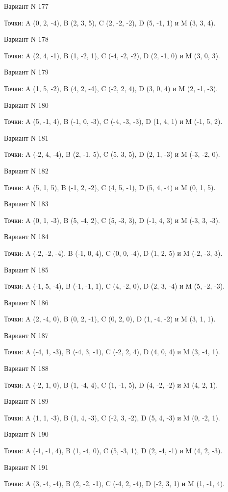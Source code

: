 \documentclass[11pt]{report}
\begin{document}
Вариант N 177

Точки: A (0, 2, -4), B (2, 3, 5), C (2, -2, -2), D (5, -1, 1) и M (3, 3, 4).

Вариант N 178

Точки: A (2, 4, -1), B (1, -2, 1), C (-4, -2, -2), D (2, -1, 0) и M (3, 0, 3).

Вариант N 179

Точки: A (1, 5, -2), B (4, 2, -4), C (-2, 2, 4), D (3, 0, 4) и M (2, -1, -3).

Вариант N 180

Точки: A (5, -1, 4), B (-1, 0, -3), C (-4, -3, -3), D (1, 4, 1) и M (-1, 5, 2).

Вариант N 181

Точки: A (-2, 4, -4), B (2, -1, 5), C (5, 3, 5), D (2, 1, -3) и M (-3, -2, 0).

Вариант N 182

Точки: A (5, 1, 5), B (-1, 2, -2), C (4, 5, -1), D (5, 4, -4) и M (0, 1, 5).

Вариант N 183

Точки: A (0, 1, -3), B (5, -4, 2), C (5, -3, 3), D (-1, 4, 3) и M (-3, 3, -3).

Вариант N 184

Точки: A (-2, -2, -4), B (-1, 0, 4), C (0, 0, -4), D (1, 2, 5) и M (-2, -3, 3).

Вариант N 185

Точки: A (-1, 5, -4), B (-1, -1, 1), C (4, -2, 0), D (2, 3, -4) и M (5, -2, -3).

Вариант N 186

Точки: A (2, -4, 0), B (0, 2, -1), C (0, 2, 0), D (1, -4, -2) и M (3, 1, 1).

Вариант N 187

Точки: A (-4, 1, -3), B (-4, 3, -1), C (-2, 2, 4), D (4, 0, 4) и M (3, -4, 1).

Вариант N 188

Точки: A (-2, 1, 0), B (1, -4, 4), C (1, -1, 5), D (4, -2, -2) и M (4, 2, 1).

Вариант N 189

Точки: A (1, 1, -3), B (1, 4, -3), C (-2, 3, -2), D (5, 4, -3) и M (0, -2, 1).

Вариант N 190

Точки: A (-1, -1, 4), B (1, -4, 0), C (5, -3, 1), D (2, -4, -1) и M (4, 2, -3).

Вариант N 191

Точки: A (3, -4, -4), B (2, -2, -1), C (-4, 2, -4), D (-2, 3, 1) и M (1, -1, 4).
\end{document}

